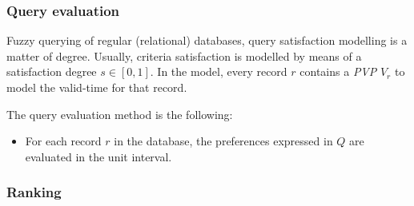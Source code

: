 
\subsubsection{Query evaluation}
Fuzzy querying of regular (relational) databases, query satisfaction modelling is a matter of degree. Usually, criteria satisfaction is modelled by means of a satisfaction degree $s \in \left[ 0, 1\right]$. In the model, every record $r$ contains a \emph{PVP} $V_r$ to model the valid-time for that record.

The query evaluation method is the following:
\begin{itemize}
\item
For each record $r$ in the database, the preferences expressed in $Q$ are evaluated in the unit interval.
\end{itemize}


\subsubsection{Ranking}